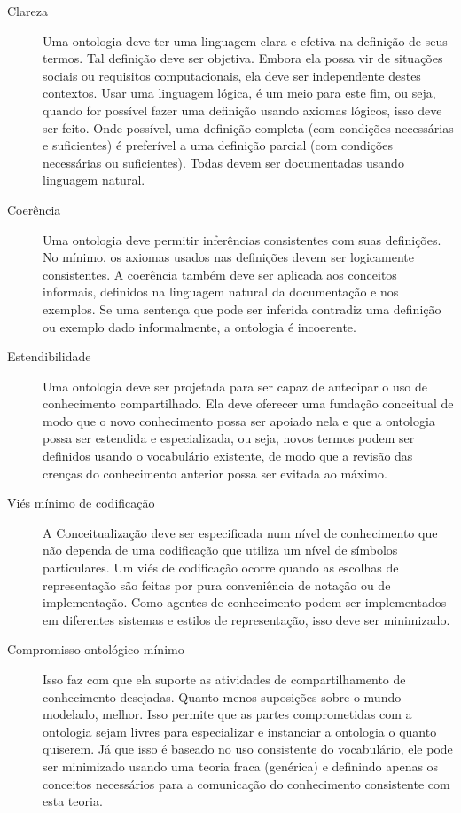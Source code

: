 \begin{description}
	\item[Clareza] Uma ontologia deve ter uma linguagem clara e efetiva na definição de seus termos. Tal definição deve ser objetiva. Embora ela possa vir de situações sociais ou requisitos computacionais, ela deve ser independente destes contextos. Usar uma linguagem lógica, é um meio para este fim, ou seja, quando for possível fazer uma definição usando axiomas lógicos, isso deve ser feito. Onde possível, uma definição completa (com condições necessárias e suficientes) é preferível a uma definição parcial (com condições necessárias ou suficientes). Todas devem ser documentadas usando linguagem natural.
	\item[Coerência] Uma ontologia deve permitir inferências consistentes com suas definições. No mínimo, os axiomas usados nas definições devem ser logicamente consistentes. A coerência também deve ser aplicada aos conceitos informais, definidos na linguagem natural da documentação e nos exemplos. Se uma sentença que pode ser inferida contradiz uma definição ou exemplo dado informalmente, a ontologia é incoerente.
	\item[Estendibilidade] Uma ontologia deve ser projetada para ser capaz de antecipar o uso de conhecimento compartilhado. Ela deve oferecer uma fundação conceitual de modo que o novo conhecimento possa ser apoiado nela e que a ontologia possa ser estendida e especializada, ou seja, novos termos podem ser definidos usando o vocabulário existente, de modo que a revisão das crenças do conhecimento anterior possa ser evitada ao máximo.
	\item[Viés mínimo de codificação] A Conceitualização deve ser especificada num nível de conhecimento que não dependa de uma codificação que utiliza um nível de símbolos particulares. Um viés de codificação ocorre quando as escolhas de representação são feitas por pura conveniência de notação ou de implementação. Como agentes de conhecimento podem ser implementados em diferentes sistemas e estilos de representação, isso deve ser minimizado.
	\item[Compromisso ontológico mínimo] Isso faz com que ela suporte as atividades de compartilhamento de conhecimento desejadas. Quanto menos suposições sobre o mundo modelado, melhor. Isso permite que as partes comprometidas com a ontologia sejam livres para especializar e instanciar a ontologia o quanto quiserem. Já que isso é baseado no uso consistente do vocabulário, ele pode ser minimizado usando uma teoria fraca (genérica) e definindo apenas os conceitos necessários para a comunicação do conhecimento consistente com esta teoria.
\end{description}


